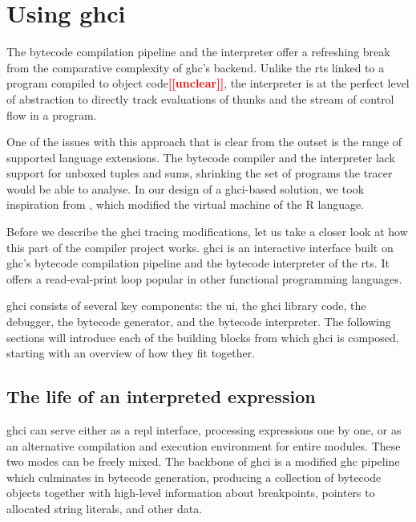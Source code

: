 \documentclass[thesis=B,english]{FITthesis}[2019/12/23]
\newcommand{\todo}[1]{\textcolor{red}{\textbf{[[#1]]}}}
\begin{document}
\section{Using \acrshort{ghci}} \label{sec:using-ghci}
The bytecode compilation pipeline and the interpreter offer a refreshing break
from the comparative complexity of \acrshort{ghc}'s backend. Unlike the
\acrshort{rts} linked to a program compiled to object code\todo{unclear}, the
interpreter is at the perfect level of abstraction to directly track
evaluations of thunks and the stream of control flow in a program.

One of the issues with this approach that is clear from the outset is the range
of supported language extensions. The bytecode compiler and the interpreter
lack support for un\-box\-ed tuples and sums, shrinking the set of programs the
tracer would be able to analyse. In our design of a \acrshort{ghci}-based
solution, we took inspiration from \cite{emp-study-laziness-r}, which modified
the virtual machine of the R language.

Before we describe the \acrshort{ghci} tracing modifications, let us take a
closer look at how this part of the compiler project works. \acrshort{ghci} is
an interactive interface built on \acrshort{ghc}'s bytecode compilation
pipeline and the bytecode interpreter of the \acrshort{rts}. It offers a
read-eval-print loop popular in other functional programming languages.

\acrshort{ghci} consists of several key components: the \acrshort{ui}, the
\acrshort{ghci} library code, the debugger, the bytecode generator, and the
bytecode interpreter. The following sections will introduce each of the
building blocks from which \acrshort{ghci} is composed, starting with an
overview of how they fit together.

\subsection*{The life of an interpreted expression}
\acrshort{ghci} can serve either as a \acrshort{repl} interface, processing
expressions one by one, or as an alternative compilation and execution
environment for entire modules. These two modes can be freely mixed. The
backbone of \acrshort{ghci} is a modified \acrshort{ghc} pipeline which
culminates in bytecode generation, producing a collection of bytecode objects
together with high-level information about breakpoints, pointers to allocated
string literals, and other data.
\end{document}
